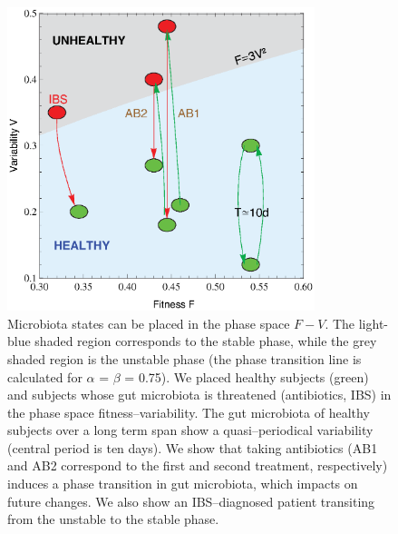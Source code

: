 \begin{figure}
	\centering
	\vspace*{-5mm} %
	\includegraphics[width=0.8\textwidth]{figs/Fig3.eps}
	\caption{Microbiota states can be placed in the phase space $F-V$. The light-blue shaded region corresponds to the stable phase, while the grey shaded region is the unstable phase (the phase transition line is calculated for  $\alpha$ = $\beta$ = 0.75). We placed healthy subjects (green) and subjects whose gut microbiota is threatened (antibiotics, IBS) in the phase space fitness--variability. The gut microbiota of healthy subjects over a long term span show a quasi--periodical variability (central period is ten days). We show that taking antibiotics (AB1 and AB2 correspond to the first and second treatment, respectively) induces a phase transition in gut microbiota, which impacts on future changes. We also show an IBS--diagnosed patient transiting from the unstable to the stable phase.}
	\label{fig:main3}
\end{figure}

